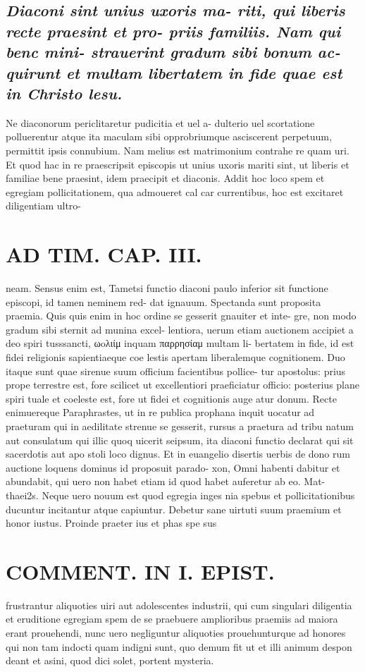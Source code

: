 \documentclass{article}
\begin{document}
\begin{pages}
\subsection*{\textit{Diaconi sint unius uxoris ma- riti, qui liberis recte praesint et pro- priis familiis. Nam qui benc mini- strauerint gradum sibi bonum ac- quirunt et multam libertatem in fide quae est in Christo lesu. }}\pstart Ne diaconorum periclitaretur pudicitia et uel a- dulterio uel scortatione polluerentur atque ita maculam sibi opprobriumque asciscerent perpetuum, permittit ipsis connubium. Nam melius est matrimonium contrahe re quam uri. Et quod hac in re praescripsit episcopis ut unius uxoris mariti sint, ut liberis et familiae bene praesint, idem praecipit et diaconis. Addit hoc loco spem et egregiam pollicitationem, qua admoueret cal car currentibus, hoc est excitaret diligentiam ultro-  \pend
\section*{AD TIM. CAP. III. }
\marginpar{[ p.133 ]}\pstart neam. Sensus enim est, Tametsi functio diaconi paulo inferior sit functione episcopi, id tamen neminem red- dat ignauum. Spectanda sunt proposita praemia. Quis quis enim in hoc ordine se gesserit gnauiter et inte- gre, non modo gradum sibi sternit ad munina excel- lentiora, uerum etiam auctionem accipiet a deo spiri tusssancti, ωoλιίμ inquam παρρησίαμ multam li- bertatem in fide, id est fidei religionis sapientiaeque coe lestis apertam liberalemque cognitionem. Duo itaque sunt quae sirenue suum officium facientibus pollice- tur apostolus: prius prope terrestre est, fore scilicet ut excellentiori praeficiatur officio: posterius plane spiri tuale et coeleste est, fore ut fidei et cognitionis auge atur donum. Recte enimuereque Paraphrastes, ut in re publica prophana inquit uocatur ad praeturam qui in aedilitate strenue se gesserit, rursus a praetura ad tribu natum aut consulatum qui illic quoq uicerit seipsum, ita diaconi functio declarat qui sit sacerdotis aut apo stoli loco dignus. Et in euangelio disertis uerbis de dono rum auctione loquens dominus id proposuit parado- xon, Omni habenti dabitur et abundabit, qui uero non habet etiam id quod habet auferetur ab eo. Mat- thaei2s. Neque uero nouum est quod egregia inges nia spebus et pollicitationibus ducuntur incitantur atque capiuntur. Debetur sane uirtuti suum praemium et honor iustus. Proinde praeter ius et phas spe sus  \pend
\section*{COMMENT. IN I. EPIST. }\pstart frustrantur aliquoties uiri aut adolescentes industrii, qui cum singulari diligentia et eruditione egregiam spem de se praebuere amplioribus praemiis ad maiora erant prouehendi, nunc uero negliguntur aliquoties prouehunturque ad honores qui non tam indocti quam indigni sunt, quo demum fit ut et illi animum despon deant et asini, quod dici solet, portent mysteria.  \pend
{}
{}

\end{pages}
\end{document}
